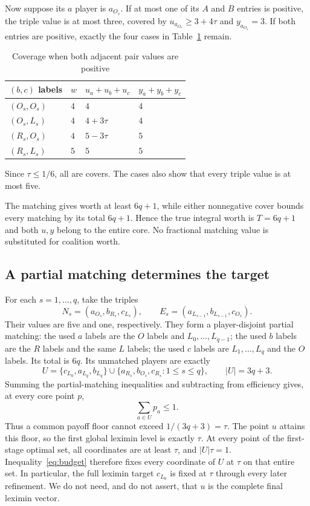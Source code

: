 \documentclass[11pt]{article}
\theoremstyle{remark}\newtheorem{remark}[theorem]{Remark}
\begin{document}
Now suppose its $a$ player is $a_{O_s}$. If at most one of its $A$ and
$B$ entries is positive, the triple value is at most three, covered by
$u_{a_{O_s}}\geq3+4\tau$ and $y_{a_{O_s}}=3$.
If both entries are positive, exactly the four cases in Table~\ref{tab:strong-cover} remain.

\begin{table}[htbp]
\centering
\caption{Coverage when both adjacent pair values are positive}\label{tab:strong-cover}
\begin{tabular}{llll}\toprule
$(b,c)$ labels & $w$ & $u_a+u_b+u_c$ & $y_a+y_b+y_c$\\\midrule
$(O_s,O_s)$ & $4$ & $4$ & $4$\\
$(O_s,L_s)$ & $4$ & $4+3\tau$ & $4$\\
$(R_s,O_s)$ & $4$ & $5-3\tau$ & $5$\\
$(R_s,L_s)$ & $5$ & $5$ & $5$\\\bottomrule
\end{tabular}
\end{table}

Since $\tau\leq1/6$, all are covers. The cases also show that every
triple value is at most five.

The matching gives worth at least $6q+1$, while either nonnegative
cover bounds every matching by its total $6q+1$. Hence the true integral
worth is $T=6q+1$ and both $u,y$ belong to the entire core. No fractional
matching value is substituted for coalition worth.

\subsection{A partial matching determines the target}
For each $s=1,\ldots,q$, take the triples
\[
 N_s=(a_{O_s},b_{R_s},c_{L_s}),\qquad
 E_s=(a_{L_{s-1}},b_{L_{s-1}},c_{O_s}).
\]
Their values are five and one, respectively. They form a player-disjoint
partial matching: the used $a$ labels are the $O$ labels and
$L_0,\ldots,L_{q-1}$; the used $b$ labels are the $R$ labels and the same
$L$ labels; the used $c$ labels are $L_1,\ldots,L_q$ and the $O$ labels.
Its total is $6q$. Its unmatched players are exactly
\begin{equation}\label{eq:unmatched}
 U=\{c_{L_0},a_{L_q},b_{L_q}\}
       \cup\{a_{R_s},b_{O_s},c_{R_s}:1\leq s\leq q\},
       \qquad |U|=3q+3.
\end{equation}
Summing the partial-matching inequalities and subtracting from efficiency
gives, at every core point $p$,
\begin{equation}\label{eq:budget}
                       \sum_{a\in U}p_a\leq1.
\end{equation}
Thus a common payoff floor cannot exceed $1/(3q+3)=\tau$. The point
$u$ attains this floor, so the first global leximin level is exactly
$\tau$. At every point of the first-stage optimal set, all coordinates are
at least $\tau$, and $|U|\tau=1$. Inequality~\eqref{eq:budget} therefore
fixes every coordinate of $U$ at $\tau$ on that entire set. In particular,
the full leximin target $c_{L_0}$ is fixed at $\tau$ through every later
refinement. We do not need, and do not assert, that $u$ is the complete
final leximin vector.
\end{document}
